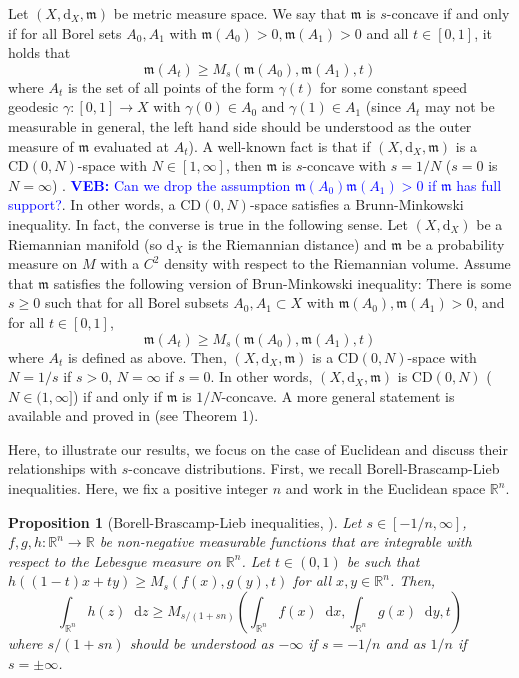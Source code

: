 \documentclass[sts]{imsart}
\newtheorem{proposition}[theorem]{Proposition}
\theoremstyle{definition}
\theoremstyle{remark}
\newcommand{\R}{\mathbb{R}}
\newcommand{\fm}{\mathfrak{m}}
\newcommand{\dist}{\mathrm{d}}
\newcommand{\CD}{\mathrm{CD}}
\newcommand*\diff{\mathop{}\!\mathrm{d}}
\newcommand{\veb}[1]{\textcolor{blue}{\textbf{VEB:}  #1}}
\begin{document}
Let $(X,\dist_X,\fm)$ be metric measure space. We say that $\fm$ is $s$-concave if and only if for all Borel sets $A_0,A_1$ with $\fm(A_0)>0, \fm(A_1)>0$ and all $t\in [0,1]$, it holds that 
$$\fm(A_t)\geq M_s(\fm(A_0),\fm(A_1),t)$$ 
where $A_t$ is the set of all points of the form $\gamma(t)$ for some constant speed geodesic $\gamma:[0,1]\to X$ with $\gamma(0)\in A_0$ and $\gamma(1)\in A_1$ (since $A_t$ may not be measurable in general, the left hand side should be understood as the outer measure of $\fm$ evaluated at $A_t$). A well-known fact is that if $(X,\dist_X,\fm)$ is a $\CD(0,N)$-space with $N\in [1,\infty]$, then $\fm$ is $s$-concave with $s=1/N$ ($s=0$ is $N=\infty$) \cite[Proposition 2.1]{SturmII}. \veb{Can we drop the assumption $\fm(A_0)\fm(A_1)>0$ if $\fm$ has full support?}. In other words, a $\CD(0,N)$-space satisfies a Brunn-Minkowski inequality. In fact, the converse is true in the following sense. Let $(X,\dist_X)$ be a Riemannian manifold (so $\dist_X$ is the Riemannian distance) and $\fm$ be a probability measure on $M$ with a $C^2$ density with respect to the Riemannian volume. Assume that $\fm$ satisfies the following version of Brun-Minkowski inequality: There is some $s\geq 0$ such that for all Borel subsets $A_0,A_1\subset X$ with $\fm(A_0),\fm(A_1)>0$, and for all $t\in [0,1]$,
$$\fm(A_t)\geq M_s(\fm(A_0),\fm(A_1),t)$$ 
where $A_t$ is defined as above. Then, $(X,\dist_X,\fm)$ is a $\CD(0,N)$-space with $N=1/s$ if $s>0$, $N=\infty$ if $s=0$. In other words, $(X,\dist_X,\fm)$ is $\CD(0,N)$ ($N\in (1,\infty]$) if and only if $\fm$ is $1/N$-concave. 
A more general statement is available and proved in \cite{magnabosco2024brunn} (see Theorem 1). 

Here, to illustrate our results, we focus on the case of Euclidean and discuss their relationships with $s$-concave distributions. First, we recall Borell-Brascamp-Lieb inequalities. Here, we fix a positive integer $n$ and work in the Euclidean space $\R^n$.

\begin{proposition}[Borell-Brascamp-Lieb inequalities, \cite{Borell,BL}] \label{Prop:BBL}
    Let $s\in [-1/n,\infty]$, $f,g,h:\R^n\to\R$ be non-negative measurable functions that are integrable with respect to the Lebesgue measure on $\R^n$. Let $t\in (0,1)$ be such that $h((1-t)x+ty)\geq M_s(f(x),g(y),t)$ for all $x,y\in \R^n$. Then, 
    $$\int_{\R^n} h(z)\diff z \geq M_{s/(1+sn)}\left(\int_{\R^n}f(x)\diff x,\int_{\R^n}g(x)\diff y ,t\right)$$
    where $s/(1+sn)$ should be understood as $-\infty$ if $s=-1/n$ and as $1/n$ if $s=\pm\infty$. 
\end{proposition}
\end{document}
